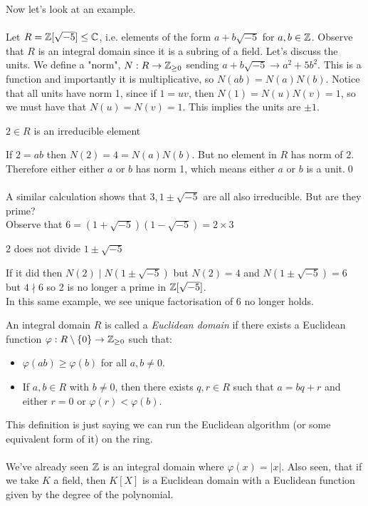 \documentclass{article}
\begin{document}
\begin{itemize}
Now let's look at an example.\\\\
Let $ R=\mathbb{Z}[\sqrt{-5}]\le \mathbb{C} $, i.e. elements of the form $ a+b\sqrt{-5} $ for $ a,b\in \mathbb{Z} $. Observe that $ R $ is an integral domain since it is a subring of a field. Let's discuss the units. We define a "norm", $ N:R\to \mathbb{Z}_{\ge 0} $ sending $ a+b\sqrt{-5}\to a^2+5b^2 $. This is a function and importantly it is multiplicative, so $ N(ab)=N(a)N(b) $. Notice that all units have norm 1, since if $ 1=uv $, then $ N(1)=N(u)N(v)=1 $, so we must have that $ N(u)=N(v)=1 $. This implies the units are $ \pm 1 $.
\begin{claim}
  $ 2\in R $ is an irreducible element
\end{claim}
\pf If $ 2=ab $ then $ N(2)=4=N(a)N(b) $. But no element in $ R $ has norm of $ 2 $. Therefore either either $ a $ or $ b $ has norm 1, which means either $ a $ or $ b $ is a unit.\qed\\\\
A similar calculation shows that $ 3, 1\pm \sqrt{-5} $ are all also irreducible.
But are they prime?\\
Observe that $ 6=(1+\sqrt{-5})(1-\sqrt{-5})=2\times 3 $
\begin{claim}
	2 does not divide $ 1\pm \sqrt{-5} $
\end{claim}
\pf If it did then $ N(2)\mid N(1\pm\sqrt{-5}) $ but $ N(2)=4 $ and $ N(1\pm \sqrt{-5})=6 $ but $ 4\nmid 6 $ so 2 is no longer a prime in $ \mathbb{Z}[\sqrt{-5}] $.\\
In this same example, we see unique factorisation of 6 no longer holds.

\begin{definition}
	An integral domain $ R $ is called a \textit{Euclidean domain} if there exists a Euclidean function $ \varphi:R\setminus \{0\}\to\mathbb{Z}_{\ge 0} $ such that:
	\begin{itemize}
	\item $ \varphi(ab)\ge \varphi(b) $ for all $ a,b\ne 0 $.
	\item If $ a,b\in R $ with $ b\ne 0 $, then there exists $ q,r\in R $ such that $ a=bq+r $ and either $ r=0 $ or $ \varphi(r)<\varphi(b) $.
	\end{itemize}
\end{definition}
This definition is just saying we can run the Euclidean algorithm (or some equivalent form of it) on the ring.\\\\
We've already seen $ \mathbb{Z} $ is an integral domain where $ \varphi(x)=|x| $. Also seen, that if we take $ K $ a field, then $ K[X] $ is a Euclidean domain with a Euclidean function given by the degree of the polynomial.\\\\


\end{itemize}
\end{document}

